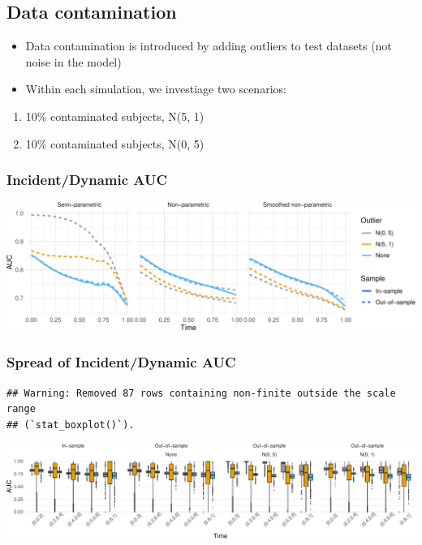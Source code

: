 \documentclass[
]{article}
\providecommand{\tightlist}{%
  \setlength{\itemsep}{0pt}\setlength{\parskip}{0pt}}
\begin{document}
\subsection{Data contamination}\label{data-contamination}

\begin{itemize}
\tightlist
\item
  Data contamination is introduced by adding outliers to test datasets
  (not noise in the model)
\item
  Within each simulation, we investiage two scenarios:
\end{itemize}

\begin{enumerate}
\def\labelenumi{\arabic{enumi}.}
\tightlist
\item
  10\% contaminated subjects, N(5, 1)
\item
  10\% contaminated subjects, N(0, 5)
\end{enumerate}

\subsubsection{Incident/Dynamic AUC}\label{incidentdynamic-auc-1}

\includegraphics{ProgressReport_files/figure-latex/fig_tv_auc_contam-1.pdf}

\subsubsection{Spread of Incident/Dynamic
AUC}\label{spread-of-incidentdynamic-auc-1}

\begin{verbatim}
## Warning: Removed 87 rows containing non-finite outside the scale range
## (`stat_boxplot()`).
\end{verbatim}

\includegraphics{ProgressReport_files/figure-latex/fig_tvauc_box_contam-1.pdf}
\end{document}
